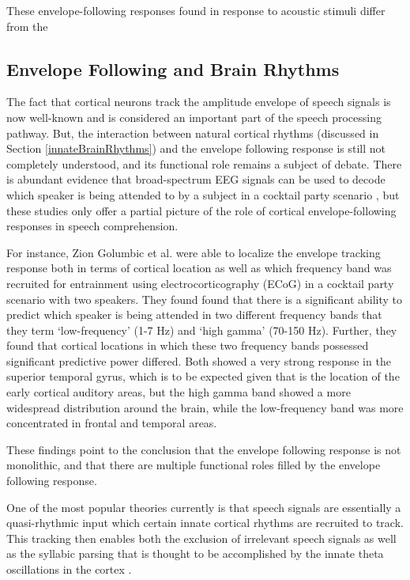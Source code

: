 \documentclass[titlepage]{article}
\begin{document}
    These envelope-following responses found in response to acoustic stimuli differ from the

  \subsection{Envelope Following and Brain Rhythms}

    The fact that cortical neurons track the amplitude envelope of speech signals is now well-known and
    is considered an important part of the speech processing pathway. But, the interaction between
    natural cortical rhythms (discussed in Section \ref{innateBrainRhythms}) and the envelope following
    response is still not completely understood, and its functional role remains a subject of debate.
    There is abundant evidence that broad-spectrum EEG signals can be used to decode which speaker is
    being attended to by a subject in a cocktail party scenario \cite{Horton2014,DeTaillez2018}, but
    these studies only offer a partial picture of the role of cortical envelope-following responses
    in speech comprehension.

    For instance, Zion Golumbic et al. \cite{ZionGolumbic2013} were able to
    localize the envelope tracking response both in terms of cortical location as well as which frequency
    band was recruited for entrainment using electrocorticography (ECoG) in a cocktail party scenario with
    two speakers. They found found that there is a significant ability to predict which speaker is being
    attended in two different frequency bands that they term `low-frequency' (1-7 Hz) and `high gamma' (70-150 Hz).
    Further, they found that cortical locations in which these two frequency bands possessed significant
    predictive power differed. Both showed a very strong response in the superior temporal gyrus,
    which is to be expected given that is the location of the early cortical auditory areas,
    but the high gamma band showed a more widespread distribution around the brain, while the low-frequency band
    was more concentrated in frontal and temporal areas.

    These findings point to the conclusion that the envelope following response is not monolithic, and
    that there are multiple functional roles filled by the envelope following response.

    One of the most popular theories currently is that speech signals
    are essentially a quasi-rhythmic input which certain innate cortical rhythms are recruited to track.
    This tracking then enables both the exclusion of irrelevant speech signals
    \cite{Horton2014,OSullivan2015} as well as the syllabic parsing that is thought to be accomplished
    by the innate theta oscillations in the cortex \cite{Doelling2014,Ghitza2013}.
\end{document}
